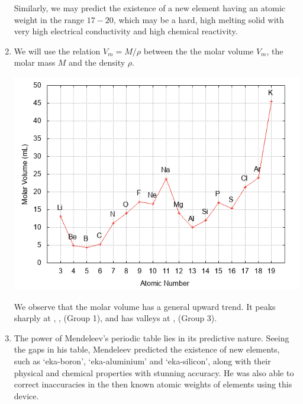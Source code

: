\documentclass[10pt]{article}
\begin{document}
\begin{enumerate}
                        Similarly, we may predict the existence of a new element  having an atomic weight in the range $17-20$,
                        which may be a hard, high melting solid with very high electrical conductivity and high chemical reactivity.
                \item We will use the relation $V_m = M / \rho$ between the the molar volume $V_m$, the molar mass $M$ and the density $\rho$.
                \begin{center}
                        \includegraphics[scale=0.7]{volumeplot.png}
                \end{center}
                We observe that the molar volume has a general upward trend. It peaks sharply at , ,  (Group 1),
                and has valleys at ,  (Group 3).
                \item
                The power of Mendeleev's periodic table lies in its predictive nature. Seeing the gaps in his table, Mendeleev predicted the
                existence of new elements, such as `eka-boron', `eka-aluminium' and `eka-silicon', along with their physical and chemical properties
                with stunning accuracy. He was also able to correct inaccuracies in the then known atomic weights of elements using this device.


\end{enumerate}
\end{document}
